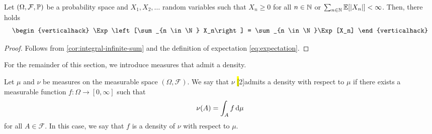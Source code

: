 \begin{corollary}\label{cor:expectation-infinite-sum}
Let $(\Omega,\mathcal{F},\mathbb{P})$ be a probability space and $X_1,X_2,\ldots$ random variables such that $X_n \geq 0$ for all $n \in \mathbb{N}$ or
\(
\sum_{n \in \mathbb{N}}\operatorname{\mathbb{E}}[|X_n|] < \infty
\).
Then, there holds
\[
\begin{verticalhack}
\Exp\left[\sum_{n \in \N} X_n\right]
=
\sum_{n \in \N}\Exp[X_n]
\end{verticalhack}
\qedhere
\]
\end{corollary}
\begin{proof}
Follows from \autoref{cor:integral-infinite-sum} and the definition of expectation \eqref{eq:expectation}.
\end{proof}

For the remainder of this section, we introduce measures that admit a density.

\begin{definition}\label{def:density-with-respect-to-measure}
Let $\mu$ and $\nu$ be measures on the measurable space $(\Omega,\mathcal{F})$.
We say that $\nu$ \hl[2]{admits a density} with respect to $\mu$ if there exists a measurable function $f : \Omega \to [0,\infty]$ such that
\[
\nu(A)
=
\int_A f\,\mathrm{d}\mu
\]
for all $A \in \mathcal{F}$.
In this case, we say that $f$ is a density of $\nu$ with respect to $\mu$.
\end{definition}

